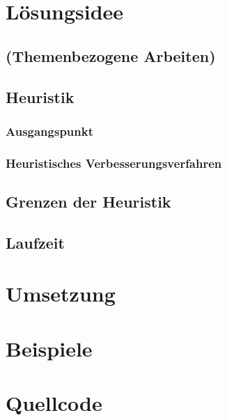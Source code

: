 \documentclass[a4paper,10pt,ngerman]{scrartcl}
\begin{document}
\section{Lösungsidee}



\subsection{(Themenbezogene Arbeiten)}





\subsection{Heuristik}
\subsubsection{Ausgangspunkt}
\subsubsection{Heuristisches Verbesserungsverfahren}

\subsection{Grenzen der Heuristik}

\subsection{Laufzeit}




\section{Umsetzung}\label{sec:umsetzung}

\section{Beispiele}

\section{Quellcode}

\end{document}
